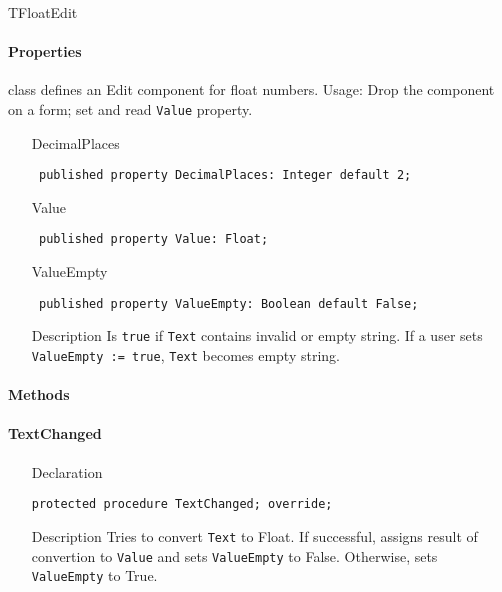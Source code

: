 \documentclass[12pt,a4paper,oneside]{report}
\newcommand{\declarationitem}[1]{{\addfontfeatures{FakeSlant} #1}}
\newcommand{\descriptiontitle}[1]{{\addfontfeatures{FakeSlant}#1}}
\newcommand{\inlineitem}[1]{{\addfontfeatures{FakeBold} #1}}
\newcommand{\code}[1]{\texttt{#1}}
\begin{document}
TFloatEdit\paragraph{Properties}\hspace*{\fill} class defines an Edit component for float numbers. Usage: Drop the component on a form; set and read \code{Value} property. 
\begin{itemize}\label{lmnumericedits.TFloatEdit-DecimalPlaces}
\item[\inlineitem{DecimalPlaces}\hfill]
\begin{flushleft}
\code{
published property DecimalPlaces: Integer default 2;}
\end{flushleft}
\label{lmnumericedits.TFloatEdit-Value}
\item[\inlineitem{Value}\hfill]
\begin{flushleft}
\code{
published property Value: Float;}
\end{flushleft}
\label{lmnumericedits.TFloatEdit-ValueEmpty}
\item[\inlineitem{ValueEmpty}\hfill]
\begin{flushleft}
\code{
published property ValueEmpty: Boolean default False;}
\end{flushleft}
\item[\descriptiontitle{Description}]
Is \code{true} if \code{Text} contains invalid or empty string. If a user sets \code{ValueEmpty := true}, \code{Text} becomes empty string.
\end{itemize}
\paragraph{Methods}\hspace*{\fill}

\paragraph{TextChanged}\hspace*{\fill}

\label{lmnumericedits.TFloatEdit-TextChanged}
\begin{itemize}\item[\declarationitem{Declaration}\hfill]
\begin{flushleft}
\code{protected procedure TextChanged; override;}
\end{flushleft}
\item[\descriptiontitle{Description}] Tries to convert \code{Text} to Float. If successful, assigns result of convertion to \code{Value} and sets \code{ValueEmpty} to False. Otherwise, sets \code{ValueEmpty} to True.
\end{itemize}
\end{document}
